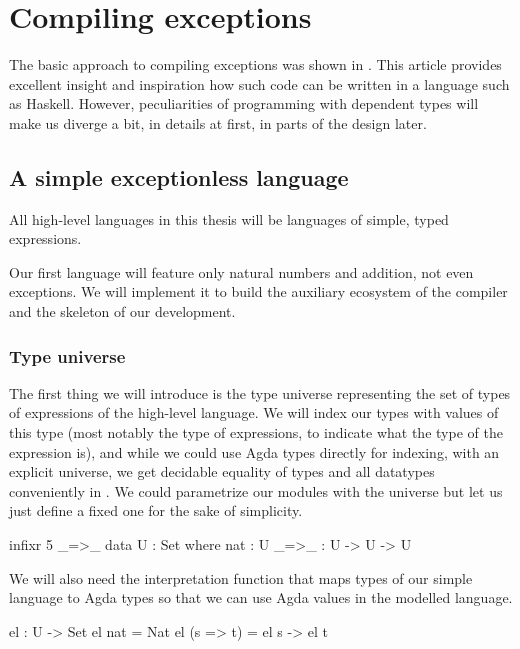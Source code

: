 \chapter{Compiling exceptions}

The basic approach to compiling exceptions was shown in \cite{gmh:exceptions}.
This article provides excellent insight and inspiration how such code can be written
in a language such as Haskell.
However, peculiarities of programming with dependent types will make us
diverge a bit, in details at first, in parts of the design later.

\section{A simple exceptionless language}

All high-level languages in this thesis will be languages of simple, typed
expressions.

Our first language will feature only natural numbers and addition, not even
exceptions. We will implement it to build the auxiliary ecosystem of the
compiler and the skeleton of our development.

\subsection{Type universe}

The first thing we will introduce is the type universe representing the set of
types of expressions of the high-level language. We will index our types with
values of this type (most notably the type  of expressions, to
indicate what the type of the expression is), and while we could use Agda types
directly for indexing, with an explicit universe, we get decidable equality of
types and all datatypes conveniently in . We could parametrize our
modules with the universe but let us just define a fixed one for the sake of
simplicity.

\begin{code}
  infixr 5 _=>_
  data U : Set where
    nat : U
    _=>_ : U -> U -> U
\end{code}

\noindent We will also need the interpretation function  that maps
types of our simple language to Agda types so that we can use Agda values in
the modelled language.

\begin{code}
  el : U -> Set
  el nat = Nat
  el (s => t) = el s -> el t
\end{code}

